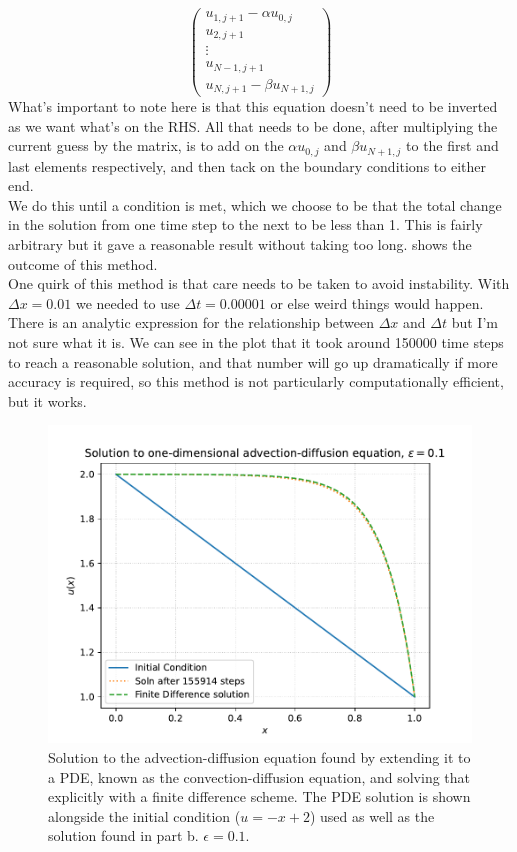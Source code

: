 \documentclass[11pt]{article}
\begin{document}
\begin{enumerate}
\begin{enumerate}
\begin{equation*}
\begin{pmatrix}
                u_{1,j+1}-\alpha u_{0,j} \\
                u_{2,j+1} \\
                \vdots \\
                u_{N-1,j+1} \\
                u_{N,j+1}-\beta u_{N+1,j}
            \end{pmatrix}
        \end{equation*}
        What's important to note here is that this equation doesn't need to be inverted as we want what's on the RHS. All that needs to be done, after multiplying the current guess by the matrix, is to add on the $\alpha u_{0,j}$ and $\beta u_{N+1,j}$ to the first and last elements respectively, and then tack on the boundary conditions to either end. \\
        We do this until a condition is met, which we choose to be that the total change in the solution from one time step to the next to be less than 1. This is fairly arbitrary but it gave a reasonable result without taking too long.  shows the outcome of this method. \\
        One quirk of this method is that care needs to be taken to avoid instability. With $\Delta x=0.01$ we needed to use $\Delta t=0.00001$ or else weird things would happen. There is an analytic expression for the relationship between $\Delta x$ and $\Delta t$ but I'm not sure what it is. We can see in the plot that it took around \num[]{150000} time steps to reach a reasonable solution, and that number will go up dramatically if more accuracy is required, so this method is not particularly computationally efficient, but it works.

        \begin{figure}[H]
            \begin{center}
                \includegraphics[width=.6\textwidth]{Plots/q1d.pdf}
                \caption{Solution to the advection-diffusion equation found by extending it to a PDE, known as the convection-diffusion equation, and solving that explicitly with a finite difference scheme. The PDE solution is shown alongside the initial condition ($u=-x+2$) used as well as the solution found in part b. $\epsilon=0.1$.}
                \label{fig:q1d}
            \end{center}
        \end{figure}
    \end{enumerate}


\end{enumerate}
\end{document}
